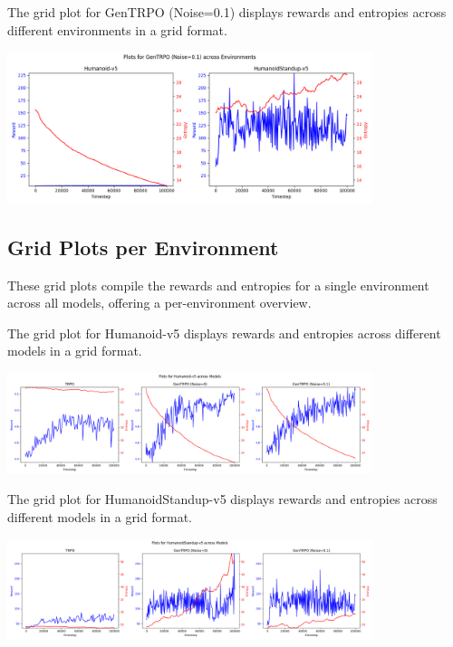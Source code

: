 \documentclass{svproc}
\begin{document}
The grid plot for GenTRPO (Noise=0.1) displays rewards and entropies across different environments in a grid format.

\begin{center}
\includegraphics[width=0.8\textwidth]{grid_model_gentrpo-ne.png}
\end{center}

\subsection{Grid Plots per Environment}
These grid plots compile the rewards and entropies for a single environment across all models, offering a per-environment overview.

The grid plot for Humanoid-v5 displays rewards and entropies across different models in a grid format.

\begin{center}
\includegraphics[width=0.8\textwidth]{grid_env_Humanoid-v5.png}
\end{center}

The grid plot for HumanoidStandup-v5 displays rewards and entropies across different models in a grid format.

\begin{center}
\includegraphics[width=0.8\textwidth]{grid_env_HumanoidStandup-v5.png}
\end{center}
\end{document}

